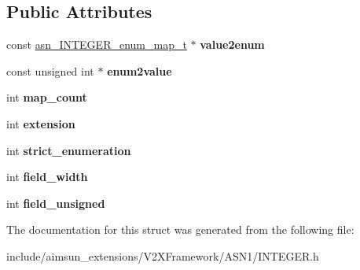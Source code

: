 \subsection*{Public Attributes}
\begin{DoxyCompactItemize}
\item 
const \hyperlink{structasn__INTEGER__enum__map__s}{asn\+\_\+\+I\+N\+T\+E\+G\+E\+R\+\_\+enum\+\_\+map\+\_\+t} $\ast$ {\bfseries value2enum}\hypertarget{structasn__INTEGER__specifics__s_a5c8b5ba4206844f3ad3b972736634cb6}{}\label{structasn__INTEGER__specifics__s_a5c8b5ba4206844f3ad3b972736634cb6}

\item 
const unsigned int $\ast$ {\bfseries enum2value}\hypertarget{structasn__INTEGER__specifics__s_a643cd7c0a03f05df0070eff704c60776}{}\label{structasn__INTEGER__specifics__s_a643cd7c0a03f05df0070eff704c60776}

\item 
int {\bfseries map\+\_\+count}\hypertarget{structasn__INTEGER__specifics__s_a43f33eddd6e3e6e07226384a4d89ed52}{}\label{structasn__INTEGER__specifics__s_a43f33eddd6e3e6e07226384a4d89ed52}

\item 
int {\bfseries extension}\hypertarget{structasn__INTEGER__specifics__s_a36c822cd98c9bfb311818d36731594aa}{}\label{structasn__INTEGER__specifics__s_a36c822cd98c9bfb311818d36731594aa}

\item 
int {\bfseries strict\+\_\+enumeration}\hypertarget{structasn__INTEGER__specifics__s_a5909a666817ee7a7cab9039bec46012b}{}\label{structasn__INTEGER__specifics__s_a5909a666817ee7a7cab9039bec46012b}

\item 
int {\bfseries field\+\_\+width}\hypertarget{structasn__INTEGER__specifics__s_a91d32a15d5be54f71a67cb6cea80a667}{}\label{structasn__INTEGER__specifics__s_a91d32a15d5be54f71a67cb6cea80a667}

\item 
int {\bfseries field\+\_\+unsigned}\hypertarget{structasn__INTEGER__specifics__s_a86a38acd726911dccc17ce915bafeebc}{}\label{structasn__INTEGER__specifics__s_a86a38acd726911dccc17ce915bafeebc}

\end{DoxyCompactItemize}


The documentation for this struct was generated from the following file\+:\begin{DoxyCompactItemize}
\item 
include/aimsun\+\_\+extensions/\+V2\+X\+Framework/\+A\+S\+N1/I\+N\+T\+E\+G\+E\+R.\+h\end{DoxyCompactItemize}
